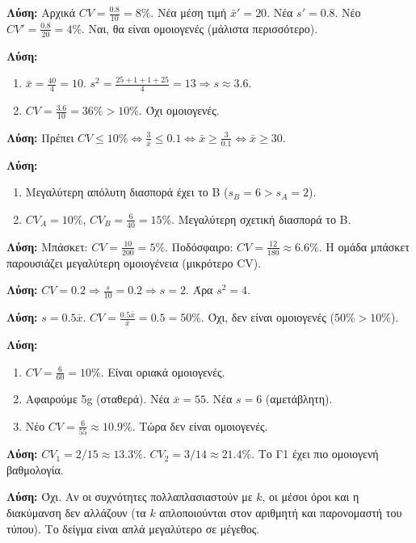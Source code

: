\documentclass[11pt,a4paper,modern]{FFExercises}
\begin{document}
\askhsh
\textbf{Λύση:}
Αρχικά $CV = \frac{0.8}{10} = 8\%$.
Νέα μέση τιμή $\bar{x}' = 20$. Νέα $s' = 0.8$.
Νέο $CV' = \frac{0.8}{20} = 4\%$.
Ναι, θα είναι ομοιογενές (μάλιστα περισσότερο).

\askhsh
\textbf{Λύση:}
\begin{enumerate}
    \item $\bar{x} = \frac{40}{4} = 10$.
    $s^2 = \frac{25+1+1+25}{4} = 13 \Rightarrow s \approx 3.6$.
    \item $CV = \frac{3.6}{10} = 36\% > 10\%$. Όχι ομοιογενές.
\end{enumerate}

\askhsh
\textbf{Λύση:}
Πρέπει $CV \le 10\% \Leftrightarrow \frac{3}{\bar{x}} \le 0.1 \Leftrightarrow \bar{x} \ge \frac{3}{0.1} \Leftrightarrow \bar{x} \ge 30$.

\askhsh
\textbf{Λύση:}
\begin{enumerate}
    \item Μεγαλύτερη απόλυτη διασπορά έχει το Β ($s_B=6 > s_A=2$).
    \item $CV_A = 10\%$, $CV_B = \frac{6}{40}=15\%$. Μεγαλύτερη σχετική διασπορά το Β.
\end{enumerate}

\askhsh
\textbf{Λύση:}
Μπάσκετ: $CV = \frac{10}{200} = 5\%$.
Ποδόσφαιρο: $CV = \frac{12}{180} \approx 6.6\%$.
Η ομάδα μπάσκετ παρουσιάζει μεγαλύτερη ομοιογένεια (μικρότερο CV).

\askhsh
\textbf{Λύση:}
$CV = 0.2 \Rightarrow \frac{s}{10} = 0.2 \Rightarrow s=2$.
Άρα $s^2 = 4$.

\askhsh
\textbf{Λύση:}
$s = 0.5 \bar{x}$.
$CV = \frac{0.5 \bar{x}}{\bar{x}} = 0.5 = 50\%$.
Όχι, δεν είναι ομοιογενές ($50\% > 10\%$).

\askhsh
\textbf{Λύση:}
\begin{enumerate}
    \item $CV = \frac{6}{60} = 10\%$. Είναι οριακά ομοιογενές.
    \item Αφαιρούμε 5g (σταθερά). Νέα $\bar{x}=55$. Νέα $s=6$ (αμετάβλητη).
    \item Νέο $CV = \frac{6}{55} \approx 10.9\%$. Τώρα δεν είναι ομοιογενές.
\end{enumerate}

\askhsh
\textbf{Λύση:}
$CV_1 = 2/15 \approx 13.3\%$.
$CV_2 = 3/14 \approx 21.4\%$.
Το Γ1 έχει πιο ομοιογενή βαθμολογία.

\askhsh
\textbf{Λύση:}
Όχι. Αν οι συχνότητες πολλαπλασιαστούν με $k$, οι μέσοι όροι και η διακύμανση δεν αλλάζουν (τα $k$ απλοποιούνται στον αριθμητή και παρονομαστή του τύπου). Το δείγμα είναι απλά μεγαλύτερο σε μέγεθος.
\end{document}
